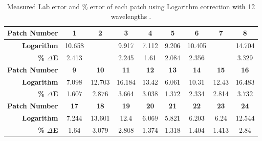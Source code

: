 \begin{table}[H]
  \caption{Measured Lab error and \% error of each patch using Logarithm correction with 12 wavelengths .}\n  \begin{center}
    \begin{tabularx}{\textwidth}{r c c c c c c c c}
    \toprule
        \textbf{Patch Number} & \textbf{1} & \textbf{2} & \textbf{3} & \textbf{4} & \textbf{5} & \textbf{6} & \textbf{7} & \textbf{8}\\ \midrule 
        \textbf{Logarithm} &10.658 &\cellcolor{colorgreen}{3.084} &9.917 &7.112 &9.206 &10.405 &\cellcolor{colorred}{18.933} &14.704\\ 
        \textbf{\textbf{\% $\Delta$E}} &2.413 &\cellcolor{colorgreen}{0.698} &2.245 &1.61 &2.084 &2.356 &\cellcolor{colorred}{4.287} &3.329\\ \midrule 
        \textbf{Patch Number} & \textbf{9} & \textbf{10} & \textbf{11} & \textbf{12} & \textbf{13} & \textbf{14} & \textbf{15} & \textbf{16}\\ \midrule 
        \textbf{Logarithm} &7.098 &12.703 &16.184 &13.42 &6.061 &10.31 &12.43 &16.483\\ 
        \textbf{\textbf{\% $\Delta$E}} &1.607 &2.876 &3.664 &3.038 &1.372 &2.334 &2.814 &3.732\\ \midrule 
        \textbf{Patch Number} & \textbf{17} & \textbf{18} & \textbf{19} & \textbf{20} & \textbf{21} & \textbf{22} & \textbf{23} & \textbf{24}\\ \midrule 
        \textbf{Logarithm} &7.244 &13.601 &12.4 &6.069 &5.821 &6.203 &6.24 &12.544\\ 
        \textbf{\textbf{\% $\Delta$E}} &1.64 &3.079 &2.808 &1.374 &1.318 &1.404 &1.413 &2.84\\ \midrule 
    \bottomrule
    \end{tabularx}
  \end{center}
\end{table}
